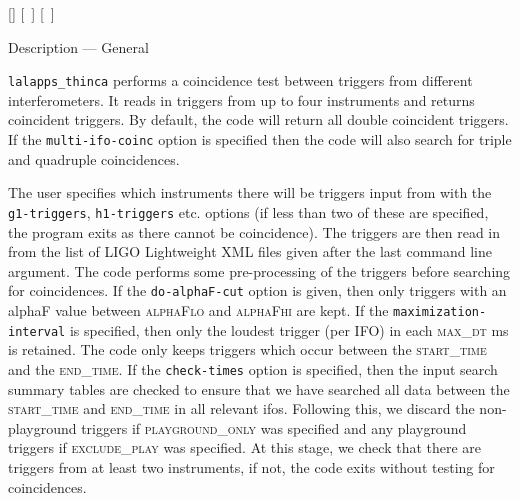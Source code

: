 \begin{entry}
 \newline \hspace*{0.5in}  
[]  \newline \hspace*{0.5in}
[~] \newline \hspace*{0.5in}
[~]  \newline \hspace*{0.5in}
\newline \hspace*{0.5in}

\item[Description --- General] 

\verb$lalapps_thinca$ performs a coincidence test between triggers from
different interferometers.  It reads in triggers from up to four instruments
and returns coincident triggers.  By default, the code will return all double
coincident triggers.  If the \texttt{multi-ifo-coinc} option is specified then
the code will also search for triple and quadruple coincidences.

The user specifies which instruments there will be triggers input from with
the \texttt{g1-triggers}, \texttt{h1-triggers} etc. options (if less than two
of these are specified, the program exits as there cannot be coincidence).
The triggers are then read in from the list of LIGO Lightweight XML files
given after the last command line argument.  The code performs some
pre-processing of the triggers before searching for coincidences.  If the
\texttt{do-alphaF-cut} option is given, then only triggers with an alphaF
value between \textsc{alphaFlo} and \textsc{alphaFhi} are kept.  If the
\texttt{maximization-interval} is specified, then only the loudest trigger
(per IFO) in each \textsc{max\_dt} ms is retained.  The code only keeps
triggers which occur between the \textsc{start\_time} and the
\textsc{end\_time}.  If the \texttt{check-times} option is specified, then the
input search summary tables are checked to ensure that we have searched all
data between the \textsc{start\_time} and \textsc{end\_time} in all relevant
ifos.  Following this, we discard the non-playground triggers if
\textsc{playground\_only} was specified and any playground triggers if
\textsc{exclude\_play} was specified.  At this stage, we check that there are
triggers from at least two instruments, if not, the code exits without testing
for coincidences. 


\end{entry}

